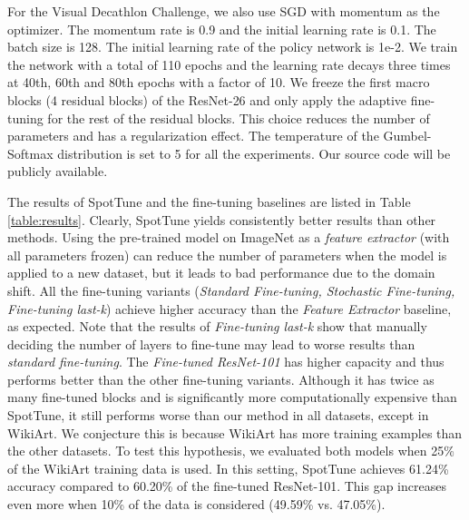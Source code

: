 \documentclass[10pt,twocolumn,letterpaper]{article}
\begin{document}
For the Visual Decathlon Challenge, we also use SGD with momentum as the optimizer. The momentum rate is 0.9 and the initial learning rate is 0.1. The batch size is 128.  The initial learning rate of the policy network is 1e-2. We train the network with a total of 110 epochs and the learning rate decays three times at 40th, 60th and 80th epochs with a factor of 10. We freeze the first macro blocks (4 residual blocks) of the ResNet-26 and only apply the adaptive fine-tuning for the rest of the residual blocks. This choice reduces the number of parameters and has a regularization effect. The temperature of the Gumbel-Softmax distribution is set to 5 for all the experiments. Our source code will be publicly available.

The results of SpotTune and the fine-tuning baselines are listed in Table \ref{table:results}. Clearly, SpotTune yields consistently better results than other methods. Using the pre-trained model on ImageNet as a {\em feature extractor} (with all parameters frozen) can reduce the number of parameters when the model is applied to a new dataset, but it leads to bad performance due to the domain shift. All the fine-tuning variants ({\em Standard Fine-tuning, Stochastic Fine-tuning, Fine-tuning last-k}) achieve higher accuracy than the {\em Feature Extractor} baseline, as expected. Note that the results of {\em Fine-tuning last-k} show that manually deciding the number of layers to fine-tune may lead to worse results than {\em standard fine-tuning}. 
The {\em Fine-tuned ResNet-101} has higher capacity and thus performs better than the other fine-tuning variants. Although it has twice as many fine-tuned blocks and is significantly more computationally expensive than SpotTune, it still performs worse than our method in all datasets, except in WikiArt. We conjecture this is because WikiArt has more training examples than the other datasets. To test this hypothesis, we evaluated both models when 25\% of the WikiArt training data is used. In this setting, SpotTune achieves 61.24\% accuracy compared to 60.20\% of the fine-tuned ResNet-101. This gap increases even more when 10\% of the data is considered (49.59\% vs. 47.05\%).
\end{document}
